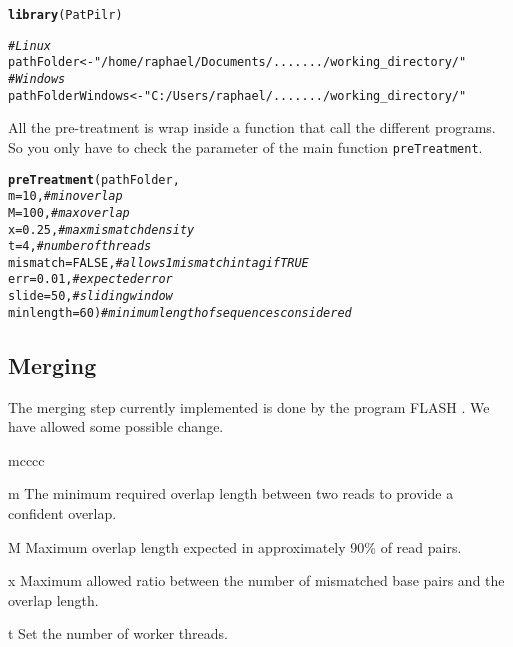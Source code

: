 \documentclass{article}\usepackage[]{graphicx}\usepackage[]{color}
\makeatletter
\newcommand{\hlnum}[1]{\textcolor[rgb]{0.686,0.059,0.569}{#1}}%
\newcommand{\hlstr}[1]{\textcolor[rgb]{0.192,0.494,0.8}{#1}}%
\newcommand{\hlcom}[1]{\textcolor[rgb]{0.678,0.584,0.686}{\textit{#1}}}%
\newcommand{\hlstd}[1]{\textcolor[rgb]{0.345,0.345,0.345}{#1}}%
\newcommand{\hlkwb}[1]{\textcolor[rgb]{0.69,0.353,0.396}{#1}}%
\newcommand{\hlkwc}[1]{\textcolor[rgb]{0.333,0.667,0.333}{#1}}%
\newcommand{\hlkwd}[1]{\textcolor[rgb]{0.737,0.353,0.396}{\textbf{#1}}}%
\newenvironment{kframe}{%
 \def\at@end@of@kframe{}%
 \ifinner\ifhmode%
  \def\at@end@of@kframe{\end{minipage}}%
  \begin{minipage}{\columnwidth}%
 \fi\fi%
 \def\FrameCommand##1{\hskip\@totalleftmargin \hskip-\fboxsep
 \colorbox{shadecolor}{##1}\hskip-\fboxsep
     \hskip-\linewidth \hskip-\@totalleftmargin \hskip\columnwidth}%
 \MakeFramed {\advance\hsize-\width
   \@totalleftmargin\z@ \linewidth\hsize
   \@setminipage}}%
 {\par\unskip\endMakeFramed%
 \at@end@of@kframe}
\newenvironment{knitrout}{}{} %
\makeatother
\begin{document}
\begin{knitrout}
\color{fgcolor}\begin{kframe}
\begin{alltt}
\hlkwd{library}\hlstd{(PatPilr)}

\hlcom{#Linux}
\hlstd{pathFolder} \hlkwb{<-} \hlstr{"/home/raphael/Documents/......./working_directory/"}
\hlcom{#Windows}
\hlstd{pathFolderWindows} \hlkwb{<-} \hlstr{"C:/Users/raphael/......./working_directory/"}
\end{alltt}
\end{kframe}
\end{knitrout}

All the pre-treatment is wrap inside a function that call the different programs. So you only have to check the parameter of the main function \texttt{preTreatment}.

\begin{knitrout}
\color{fgcolor}\begin{kframe}
\begin{alltt}
\hlkwd{preTreatment}\hlstd{(pathFolder,}
  \hlkwc{m} \hlstd{=} \hlnum{10}\hlstd{,} \hlcom{# min overlap}
  \hlkwc{M} \hlstd{=} \hlnum{100}\hlstd{,} \hlcom{# max overlap}
  \hlkwc{x} \hlstd{=} \hlnum{0.25}\hlstd{,} \hlcom{# max mismatch density}
  \hlkwc{t} \hlstd{=} \hlnum{4}\hlstd{,} \hlcom{# number of threads}
  \hlkwc{mismatch} \hlstd{=} \hlnum{FALSE}\hlstd{,} \hlcom{# allows 1 mismatch in tag if TRUE}
  \hlkwc{err} \hlstd{=} \hlnum{0.01}\hlstd{,} \hlcom{# expected error}
  \hlkwc{slide} \hlstd{=} \hlnum{50}\hlstd{,} \hlcom{# sliding window}
  \hlkwc{minlength} \hlstd{=} \hlnum{60}\hlstd{)} \hlcom{# minimum length of sequences considered}
\end{alltt}
\end{kframe}
\end{knitrout}


\subsection{Merging}
\label{subsec:merge}

The merging step currently implemented is done by the program FLASH \cite{Magoc2011}. We have allowed some possible change.

\begin{labeling}{mcccc}
\item [m] The minimum required overlap length between two reads to provide a confident overlap.
\item [M] Maximum overlap length expected in approximately 90\% of read pairs.
\item [x] Maximum allowed ratio between the number of mismatched base pairs and the overlap length.
\item [t] Set the number of worker threads.
\end{labeling}
\end{document}
